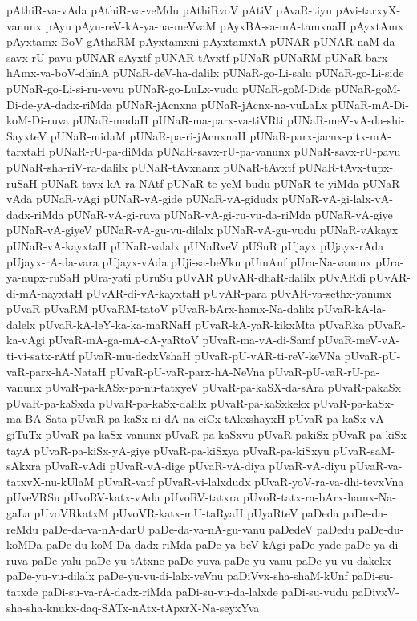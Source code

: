 {pAthiR-va-vAda
pAthiR-va-veMdu
pAthiRvoV
pAtiV
pAvaR-tiyu
pAvi-tarxyX-vanunx
pAyu
pAyu-reV-kA-ya-na-meVvaM
pAyxBA-sa-mA-tamxnaH
pAyxtAmx
pAyxtamx-BoV-gAthaRM
pAyxtamxni
pAyxtamxtA
pUNAR
pUNAR-naM-da-savx-rU-pavu
pUNAR-sAyxtf
pUNAR-tAvxtf
pUNaR
pUNaRM
pUNaR-barx-hAmx-va-boV-dhinA
pUNaR-deV-ha-dalilx
pUNaR-go-Li-salu
pUNaR-go-Li-side
pUNaR-go-Li-si-ru-vevu
pUNaR-go-LuLx-vudu
pUNaR-goM-Dide
pUNaR-goM-Di-de-yA-dadx-riMda
pUNaR-jAcnxna
pUNaR-jAcnx-na-vuLaLx
pUNaR-mA-Di-koM-Di-ruva
pUNaR-madaH
pUNaR-ma-parx-va-tiVRti
pUNaR-meV-vA-da-shi-SayxteV
pUNaR-midaM
pUNaR-pa-ri-jAcnxnaH
pUNaR-parx-jacnx-pitx-mA-tarxtaH
pUNaR-rU-pa-diMda
pUNaR-savx-rU-pa-vanunx
pUNaR-savx-rU-pavu
pUNaR-sha-riV-ra-dalilx
pUNaR-tAvxnanx
pUNaR-tAvxtf
pUNaR-tAvx-tupx-ruSaH
pUNaR-tavx-kA-ra-NAtf
pUNaR-te-yeM-budu
pUNaR-te-yiMda
pUNaR-vAda
pUNaR-vAgi
pUNaR-vA-gide
pUNaR-vA-gidudx
pUNaR-vA-gi-lalx-vA-dadx-riMda
pUNaR-vA-gi-ruva
pUNaR-vA-gi-ru-vu-da-riMda
pUNaR-vA-giye
pUNaR-vA-giyeV
pUNaR-vA-gu-vu-dilalx
pUNaR-vA-gu-vudu
pUNaR-vAkayx
pUNaR-vA-kayxtaH
pUNaR-valalx
pUNaRveV
pUSuR
pUjayx
pUjayx-rAda
pUjayx-rA-da-vara
pUjayx-vAda
pUji-sa-beVku
pUmAnf
pUra-Na-vanunx
pUra-ya-nupx-ruSaH
pUra-yati
pUruSu
pUvAR
pUvAR-dhaR-dalilx
pUvARdi
pUvAR-di-mA-nayxtaH
pUvAR-di-vA-kayxtaH
pUvAR-para
pUvAR-va-sethx-yanunx
pUvaR
pUvaRM
pUvaRM-tatoV
pUvaR-bArx-hamx-Na-dalilx
pUvaR-kA-la-dalelx
pUvaR-kA-leY-ka-ka-maRNaH
pUvaR-kA-yaR-kikxMta
pUvaRka
pUvaR-ka-vAgi
pUvaR-mA-ga-mA-cA-yaRtoV
pUvaR-ma-vA-di-Samf
pUvaR-meV-vA-ti-vi-satx-rAtf
pUvaR-mu-dedxVshaH
pUvaR-pU-vAR-ti-reV-keVNa
pUvaR-pU-vaR-parx-hA-NataH
pUvaR-pU-vaR-parx-hA-NeVna
pUvaR-pU-vaR-rU-pa-vanunx
pUvaR-pa-kASx-pa-nu-tatxyeV
pUvaR-pa-kaSX-da-sAra
pUvaR-pakaSx
pUvaR-pa-kaSxda
pUvaR-pa-kaSx-dalilx
pUvaR-pa-kaSxkekx
pUvaR-pa-kaSx-ma-BA-Sata
pUvaR-pa-kaSx-ni-dA-na-ciCx-tAkxshayxH
pUvaR-pa-kaSx-vA-giTuTx
pUvaR-pa-kaSx-vanunx
pUvaR-pa-kaSxvu
pUvaR-pakiSx
pUvaR-pa-kiSx-tayA
pUvaR-pa-kiSx-yA-giye
pUvaR-pa-kiSxya
pUvaR-pa-kiSxyu
pUvaR-saM-sAkxra
pUvaR-vAdi
pUvaR-vA-dige
pUvaR-vA-diya
pUvaR-vA-diyu
pUvaR-va-tatxvX-nu-kUlaM
pUvaR-vatf
pUvaR-vi-lalxdudx
pUvaR-yoV-ra-va-dhi-tevxVna
pUveVRSu
pUvoRV-katx-vAda
pUvoRV-tatxra
pUvoR-tatx-ra-bArx-hamx-Na-gaLa
pUvoVRkatxM
pUvoVR-katx-mU-taRyaH
pUyaRteV
paDeda
paDe-da-reMdu
paDe-da-va-nA-darU
paDe-da-va-nA-gu-vanu
paDedeV
paDedu
paDe-du-koMDa
paDe-du-koM-Da-dadx-riMda
paDe-ya-beV-kAgi
paDe-yade
paDe-ya-di-ruva
paDe-yalu
paDe-yu-tAtxne
paDe-yuva
paDe-yu-vanu
paDe-yu-vu-dakekx
paDe-yu-vu-dilalx
paDe-yu-vu-di-lalx-veVnu
paDiVvx-sha-shaM-kUnf
paDi-su-tatxde
paDi-su-va-rA-dadx-riMda
paDi-su-vu-da-lalxde
paDi-su-vudu
paDivxV-sha-sha-knukx-daq-SATx-nAtx-tApxrX-Na-seyxYva
}
